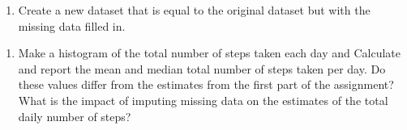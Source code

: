 \documentclass[]{article}
\newenvironment{Shaded}{\begin{snugshade}}{\end{snugshade}}
\newcommand{\KeywordTok}[1]{\textcolor[rgb]{0.13,0.29,0.53}{\textbf{#1}}}
\newcommand{\DataTypeTok}[1]{\textcolor[rgb]{0.13,0.29,0.53}{#1}}
\newcommand{\StringTok}[1]{\textcolor[rgb]{0.31,0.60,0.02}{#1}}
\newcommand{\OtherTok}[1]{\textcolor[rgb]{0.56,0.35,0.01}{#1}}
\newcommand{\OperatorTok}[1]{\textcolor[rgb]{0.81,0.36,0.00}{\textbf{#1}}}
\newcommand{\NormalTok}[1]{#1}
\providecommand{\tightlist}{%
  \setlength{\itemsep}{0pt}\setlength{\parskip}{0pt}}
\begin{document}
\begin{Shaded}
\end{Shaded}

\begin{enumerate}
\def\labelenumi{\arabic{enumi}.}
\setcounter{enumi}{2}
\tightlist
\item
  Create a new dataset that is equal to the original dataset but with
  the missing data filled in.
\end{enumerate}

\begin{Shaded}
\end{Shaded}

\begin{enumerate}
\def\labelenumi{\arabic{enumi}.}
\setcounter{enumi}{3}
\tightlist
\item
  Make a histogram of the total number of steps taken each day and
  Calculate and report the mean and median total number of steps taken
  per day. Do these values differ from the estimates from the first part
  of the assignment? What is the impact of imputing missing data on the
  estimates of the total daily number of steps?
\end{enumerate}
\end{document}
